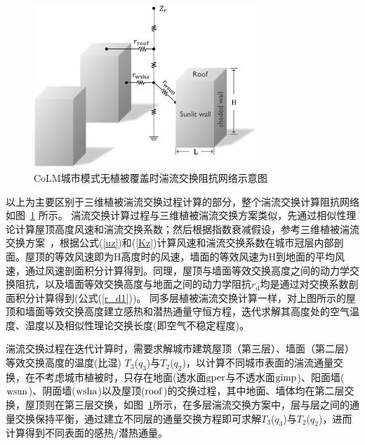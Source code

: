 {
  \begin{figure}[htbp]
    \centering
    \includegraphics[width=0.75\textwidth]{Figures/城市模式/CoLM城市模式无植被阻抗交换网络.png}
    \caption{CoLM城市模式无植被覆盖时湍流交换阻抗网络示意图}
    \label{fig:无植被覆盖时城市湍流交换阻抗示意图}
  \end{figure}
}

以上为主要区别于三维植被湍流交换过程计算的部分，整个湍流交换计算阻抗网络如图~\ref{fig:无植被覆盖时城市湍流交换阻抗示意图} 所示。
湍流交换计算过程与三维植被湍流交换方案类似，先通过相似性理论计算屋顶高度风速和湍流交换系数；然后根据指数衰减假设，参考三维植被湍流交换方案~\citep{dai2019different}，根据公式(\ref{uz})和(\ref{Kz})计算风速和湍流交换系数在城市冠层内部剖面。屋顶的等效风速即为H高度时的风速，墙面的等效风速为H到地面的平均风速，通过风速剖面积分计算得到。同理，屋顶与墙面等效交换高度之间的动力学交换阻抗，以及墙面等效交换高度与地面之间的动力学阻抗$r_{\mathrm {d}}$均是通过对交换系数剖面积分计算得到(公式(\ref{r_d1}))。
同多层植被湍流交换计算一样，对上图所示的屋顶和墙面等效交换高度建立感热和潜热通量守恒方程，迭代求解其高度处的空气温度、湿度以及相似性理论交换长度(即空气不稳定程度)。

湍流交换过程在迭代计算时，需要求解城市建筑屋顶（第三层）、墙面（第二层）等效交换高度的温度(比湿) $T_3$($q_3$)与$T_2$($q_2$)，以计算不同城市表面的湍流通量交换，在不考虑城市植被时，只存在地面(透水面$\rm gper$与不透水面$\rm gimp$)、阳面墙($\rm wsun$)、阴面墙($\rm wsha$)以及屋顶($\rm roof$)的交换过程，其中地面、墙体均在第二层交换，屋顶则在第三层交换，如图~\ref{fig:无植被覆盖时城市湍流交换阻抗示意图}所示，在多层湍流交换方案中，层与层之间的通量交换保持平衡，通过建立不同层的通量交换方程即可求解$T_3$($q_3$)与$T_2$($q_2$)，进而计算得到不同表面的感热/潜热通量。

